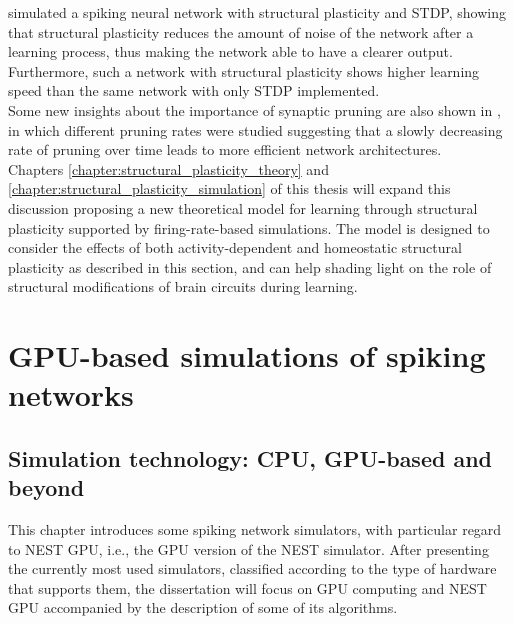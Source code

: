 \documentclass[a4paper, 12pt, twoside, openright]{book}
\begin{document}
\cite{Spiess2016} simulated a spiking neural network with structural plasticity and STDP, showing that structural plasticity reduces the amount of noise of the network after a learning process, thus making the network able to have a clearer output. Furthermore, such a network with structural plasticity shows higher learning speed than the same network with only STDP implemented.\\
Some new insights about the importance of synaptic pruning are also shown in \cite{Navlakha2015}, in which different pruning rates were studied suggesting that a slowly decreasing rate of pruning over time leads to more efficient network architectures.\\
Chapters \ref{chapter:structural_plasticity_theory} and \ref{chapter:structural_plasticity_simulation} of this thesis will expand this discussion proposing a new theoretical model for learning through structural plasticity supported by firing-rate-based simulations. The model is designed to consider the effects of both activity-dependent and homeostatic structural plasticity as described in this section, and can help shading light on the role of structural modifications of brain circuits during learning.


\part{GPU-based simulations of spiking networks}
\label{part:I}

\chapter{\textbf{Simulation technology: CPU, GPU-based and beyond}}
\label{chapter:intro_simulators}

\begin{tcolorbox}[colback=white,colframe=DarkRed,title=\textbf{Summary}]
This chapter introduces some spiking network simulators, with particular regard to NEST GPU, i.e., the GPU version of the NEST simulator. After presenting the currently most used simulators, classified according to the type of hardware that supports them, the dissertation will focus on GPU computing and NEST GPU accompanied by the description of some of its algorithms.
\end{tcolorbox}
\end{document}
